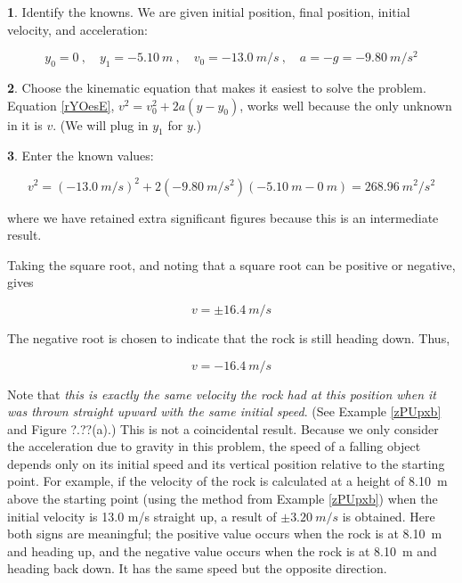 \documentclass[main-ap-physics.tex]{subfiles}
\begin{document}
\textbf{1}. Identify the knowns. We are given initial position, final position, initial velocity, and acceleration:

\begin{equation*}
    y_0 = 0\ , \quad
    y_1 = \SI{-5.10}{m}\ , \quad
    v_0 = \SI{-13.0}{m/s}\ , \quad
    a = -g = -\SI{9.80}{m/s^2}
\end{equation*}

\textbf{2}. Choose the kinematic equation that makes it easiest to solve the problem. Equation \eqref{rYOesE}, $v^2 = v_0^2 + 2 a (y - y_0)$, works well because the only unknown in it is $v$. (We will plug in $y_1$ for $y$.)

\vspace{1em}

\textbf{3}. Enter the known values:

\begin{equation*}
    v^2 = \left(\SI{-13.0}{m/s}\right)^2 + 2 \left(\SI{-9.80}{m/s^2}\right) \left(\SI{-5.10}{m} - \SI{0}{m}\right) = \SI{268.96}{m^2/s^2}
\end{equation*}

where we have retained extra significant figures because this is an intermediate result.

\vspace{1em}

Taking the square root, and noting that a square root can be positive or negative, gives

\begin{equation*}
    v = \pm \SI{16.4}{m/s}
\end{equation*}

The negative root is chosen to indicate that the rock is still heading down. Thus,

\begin{equation*}
    v = -\SI{16.4}{m/s}
\end{equation*}

Note that \textit{this is exactly the same velocity the rock had at this position when it was thrown straight upward with the same initial speed}. (See Example \ref{zPUpxb} and Figure ?.??(a).) This is not a coincidental result. Because we only consider the acceleration due to gravity in this problem, the speed of a falling object depends only on its initial speed and its vertical position relative to the starting point. For example, if the velocity of the rock is calculated at a height of \SI{8.10}{m} above the starting point (using the method from Example \ref{zPUpxb}) when the initial velocity is 13.0 m/s straight up, a result of $\pm \SI{3.20}{m/s}$ is obtained. Here both signs are meaningful; the positive value occurs when the rock is at \SI{8.10}{m} and heading up, and the negative value occurs when the rock is at \SI{8.10}{m} and heading back down. It has the same speed but the opposite direction.
\end{document}
